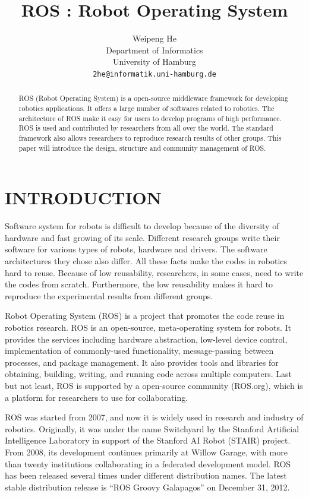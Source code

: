 \documentclass[a4paper, 10pt, conference]{ieeeconf}       %
\title{\LARGE \bf
  ROS : Robot Operating System
}
\author{
  Weipeng He
\\ Department of Informatics\\ University of Hamburg \\ {\tt\small 2he@informatik.uni-hamburg.de}
}
\begin{document}
\maketitle
\thispagestyle{empty}
\pagestyle{empty}

\begin{abstract}
  ROS (Robot Operating System) is a open-source middleware framework for developing robotics applications. It offers a large number of softwares related to robotics. The architecture of ROS make it easy for users to develop programs of high performance. ROS is used and contributed by researchers from all over the world. The standard framework also allows researchers to reproduce research results of other groups. This paper will introduce the design, structure and community management of ROS.
\end{abstract}


\section{INTRODUCTION}

Software system for robots is difficult to develop because of the diversity of hardware and fast growing of its scale. Different research groups write their software for various types of robots, hardware and drivers. The software architectures they chose also differ. All these facts make the codes in robotics hard to reuse. Because of low reusability, researchers, in some cases, need to write the codes from scratch. Furthermore, the low reusability makes it hard to reproduce the experimental results from different groups.

Robot Operating System (ROS) is a project that promotes the code reuse in robotics research\cite{quigley_ros:_2009}. ROS is an open-source, meta-operating system for robots. It provides the services including hardware abstraction, low-level device control, implementation of commonly-used functionality, message-passing between processes, and package management. It also provides tools and libraries for obtaining, building, writing, and running code across multiple computers. Last but not least, ROS is supported by a open-source community (ROS.org), which is a platform for researchers to use for collaborating.

ROS was started from 2007, and now it is widely used in research and industry of robotics. Originally, it was under the name Switchyard by the Stanford Artificial Intelligence Laboratory in support of the Stanford AI Robot (STAIR) project. From 2008, its development continues primarily at Willow Garage, with more than twenty institutions collaborating in a federated development model. ROS has been released several times under different distribution names. The latest stable distribution release is ``ROS Groovy Galapagos'' on December 31, 2012\cite{_documentation_2013}.
\end{document}

